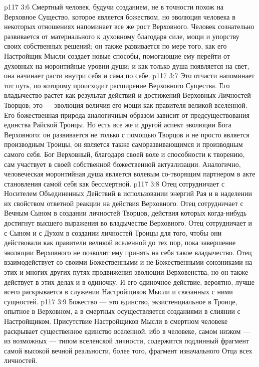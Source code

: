 \vs p117 3:6 Смертный человек, будучи созданием, не в точности похож на Верховное Существо, которое является божеством, но эволюция человека в некоторых отношениях напоминает все же рост Верховного. Человек сознательно развивается от материального к духовному благодаря силе, мощи и упорству своих собственных решений; он также развивается по мере того, как его Настройщик Мысли создает новые способы, помогающие ему перейти от духовных на моронтийные уровни души; и как только душа появляется на свет, она начинает расти внутри себя и сама по себе.
\vs p117 3:7 Это отчасти напоминает тот путь, по которому происходит расширение Верховного Существа. Его владычество растет как результат действий и достижений Верховных Личностей Творцов; это --- эволюция величия его мощи как правителя великой вселенной. Его божественная природа аналогичным образом зависит от предсуществования единства Райской Троицы. Но есть все же и другой аспект эволюции Бога Верховного: он развивается не только с помощью Творцов и не просто является производным Троицы, он является также саморазвивающимся и производным самого себя. Бог Верховный, благодаря своей воле и способности к творению, сам участвует в своей собственной божественной актуализации. Аналогично, человеческая моронтийная душа является волевым со\hyp{}творящим партнером в акте становления самой себя как бессмертной.
\vs p117 3:8 \pc Отец сотрудничает с Носителем Объединенных Действий в использовании энергий Рая и в наделении их свойством ответной реакции на действия Верховного. Отец сотрудничает с Вечным Сыном в создании личностей Творцов, действия которых когда\hyp{}нибудь достигнут высшего выражения во владычестве Верховного. Отец сотрудничает и с Сыном и с Духом в создании личностей Троицы для того, чтобы они действовали как правители великой вселенной до тех пор, пока завершение эволюции Верховного не позволит ему принять на себя такое владычество. Отец взаимодействует со своими Божественными и не\hyp{}Божественными союзниками на этих и многих других путях продвижения эволюции Верховенства, но он также действует в этих делах и в одиночку. И его одиночное действие, вероятно, лучше всего раскрывается в служении Настройщиков Мысли и связанных с ними сущностей.
\vs p117 3:9 Божество --- это единство, экзистенциальное в Троице, опытное в Верховном, а в смертных осуществляется созданиями в слиянии с Настройщиком. Присутствие Настройщиков Мысли в смертном человеке раскрывает существенное единство вселенной, ибо в человеке, самом низком --- из возможных --- типом вселенской личности, содержится подлинный фрагмент самой высокой вечной реальности, более того, фрагмент изначального Отца всех личностей.
